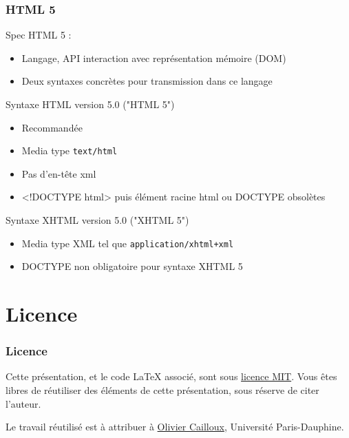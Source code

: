 \documentclass[english, french]{beamer}
\begin{document}
\begin{frame}
	\frametitle{HTML 5}
	Spec HTML 5 : 
	\begin{itemize}
		\item Langage, API interaction avec représentation mémoire (DOM)
		\item Deux syntaxes concrètes pour transmission dans ce langage
	\end{itemize}
	\begin{block}{Syntaxe HTML version 5.0 ("HTML 5")}
		\begin{itemize}
			\item Recommandée
			\item Media type \texttt{text/html}
			\item Pas d’en-tête xml
			\item{} <!DOCTYPE html> puis élément racine html {\tiny ou DOCTYPE obsolètes}%
		\end{itemize}
	\end{block}
	\begin{block}{Syntaxe XHTML version 5.0 ("XHTML 5")}
		\begin{itemize}
			\item Media type XML tel que \texttt{application/xhtml+xml}
			\item DOCTYPE non obligatoire pour syntaxe XHTML 5
		\end{itemize}
	\end{block}
\end{frame}

\section{Licence}
\begin{frame}
	\frametitle{Licence}
	Cette présentation, et le code LaTeX associé, sont sous \href{https://opensource.org/licenses/MIT}{licence MIT}. Vous êtes libres de réutiliser des éléments de cette présentation, sous réserve de citer l’auteur.
	
	Le travail réutilisé est à attribuer à \href{http://www.lamsade.dauphine.fr/~ocailloux/}{Olivier Cailloux}, Université Paris-Dauphine.
\end{frame}
\end{document}
